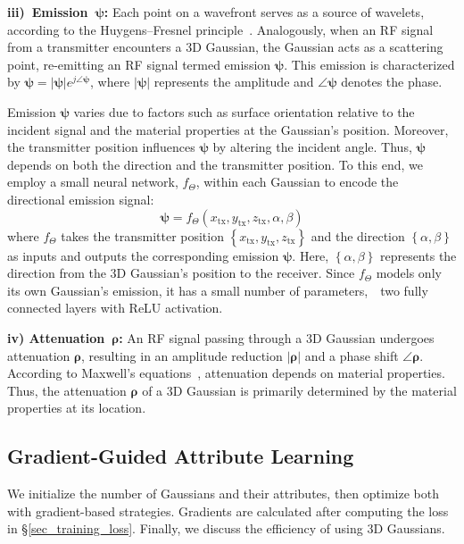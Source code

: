 \textbf{iii)~Emission~\(\boldsymbol{\psi}\):}
Each point on a wavefront serves as a source of wavelets, according to the Huygens–Fresnel principle~\cite{born2013principles}.
Analogously, when an RF signal from a transmitter encounters a 3D Gaussian, the Gaussian acts as a scattering point, re-emitting an RF signal termed emission \(\boldsymbol{\psi}\). 
This emission is characterized by \(\boldsymbol{\psi} = \left|\boldsymbol{\psi}\right| e^{j \angle \boldsymbol{\psi}}\), where \(\left|\boldsymbol{\psi}\right|\) represents the amplitude and \(\angle \boldsymbol{\psi}\) denotes the phase.



Emission \(\boldsymbol{\psi}\) varies due to factors such as surface orientation relative to the incident signal and the material properties at the Gaussian's position.  
Moreover, the transmitter position influences \(\boldsymbol{\psi}\) by altering the incident angle.  
Thus, \(\boldsymbol{\psi}\) depends on both the direction and the transmitter position.
To this end, we employ a small neural network, \(f_\Theta\), within each Gaussian to encode the directional emission signal:
\begin{equation}
\label{eqn_radiance_mlp}
\boldsymbol{\psi} = f_\Theta \left(x_{\text{tx}}, y_{\text{tx}}, z_{\text{tx}}, \alpha, \beta\right)
\end{equation}
where \(f_\Theta\) takes the transmitter position \(\left\{x_{\text{tx}}, y_{\text{tx}}, z_{\text{tx}}\right\}\) and the direction \(\left\{\alpha, \beta\right\}\) as inputs and outputs the corresponding emission \(\boldsymbol{\psi}\). 
Here, \(\left\{\alpha, \beta\right\}\) represents the direction from the 3D Gaussian's position to the receiver.  
Since \(f_\Theta\) models only its own Gaussian's emission, it has a small number of parameters,~\ie~two fully connected layers with ReLU activation.



\textbf{iv) Attenuation~\(\boldsymbol{\rho}\):}
An RF signal passing through a 3D Gaussian undergoes attenuation \(\boldsymbol{\rho}\), resulting in an amplitude reduction \( \left|\boldsymbol{\rho}\right| \) and a phase shift \( \angle \boldsymbol{\rho} \).  
According to Maxwell's equations~\cite{maxwell1873treatise}, attenuation depends on material properties.  
Thus, the attenuation \(\boldsymbol{\rho}\) of a 3D Gaussian is primarily determined by the material properties at its location.



\subsection{Gradient-Guided Attribute Learning}  
We initialize the number of Gaussians and their attributes, then optimize both with gradient-based strategies. 
Gradients are calculated after computing the loss in §\ref{sec_training_loss}.  
Finally, we discuss the efficiency of using 3D Gaussians.


